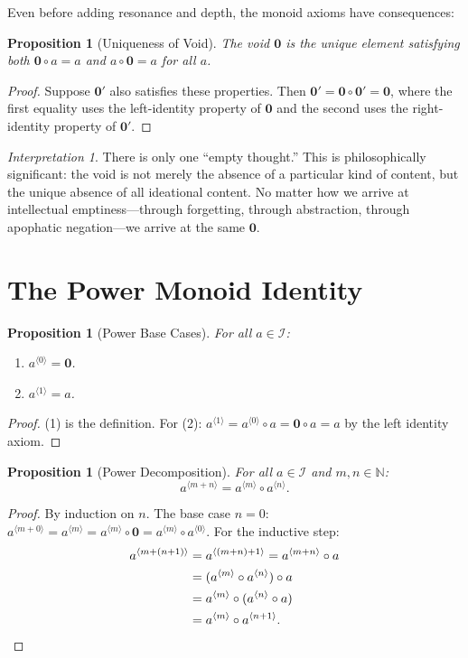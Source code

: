 \documentclass[11pt,openany]{book}
\theoremstyle{definition}
\theoremstyle{plain}
\newtheorem{proposition}[axiom]{Proposition}
\theoremstyle{remark}
\newtheorem{interpretation}[axiom]{Interpretation}
\newcommand{\IS}{\mathcal{I}}               %
\newcommand{\compose}{\circ}                 %
\newcommand{\void}{\mathbf{0}}              %
\newcommand{\compN}[2]{#1^{\langle #2 \rangle}} %
\begin{document}
Even before adding resonance and depth, the monoid axioms have consequences:

\begin{proposition}[Uniqueness of Void]
\label{prop:void-unique}
The void $\void$ is the unique element satisfying both $\void \compose a = a$ and $a \compose \void = a$ for all $a$.
\end{proposition}

\begin{proof}
Suppose $\void'$ also satisfies these properties. Then $\void' = \void \compose \void' = \void$, where the first equality uses the left-identity property of $\void$ and the second uses the right-identity property of $\void'$.
\end{proof}

\begin{interpretation}
There is only one ``empty thought.'' This is philosophically significant: the void is not merely the absence of a particular kind of content, but the unique absence of all ideational content. No matter how we arrive at intellectual emptiness---through forgetting, through abstraction, through apophatic negation---we arrive at the same $\void$.
\end{interpretation}

\section{The Power Monoid Identity}

\begin{proposition}[Power Base Cases]
For all $a \in \IS$:
\begin{enumerate}
\item $\compN{a}{0} = \void$.
\item $\compN{a}{1} = a$.
\end{enumerate}
\end{proposition}

\begin{proof}
(1) is the definition. For (2): $\compN{a}{1} = \compN{a}{0} \compose a = \void \compose a = a$ by the left identity axiom.
\end{proof}

\begin{proposition}[Power Decomposition]
For all $a \in \IS$ and $m, n \in \mathbb{N}$:
\[
\compN{a}{m+n} = \compN{a}{m} \compose \compN{a}{n}.
\]
\end{proposition}

\begin{proof}
By induction on $n$. The base case $n = 0$: $\compN{a}{m+0} = \compN{a}{m} = \compN{a}{m} \compose \void = \compN{a}{m} \compose \compN{a}{0}$. For the inductive step:
\begin{align*}
\compN{a}{m+(n+1)} &= \compN{a}{(m+n)+1} = \compN{a}{m+n} \compose a \\
&= (\compN{a}{m} \compose \compN{a}{n}) \compose a \\
&= \compN{a}{m} \compose (\compN{a}{n} \compose a) \\
&= \compN{a}{m} \compose \compN{a}{n+1}. \qedhere
\end{align*}
\end{proof}
\end{document}
